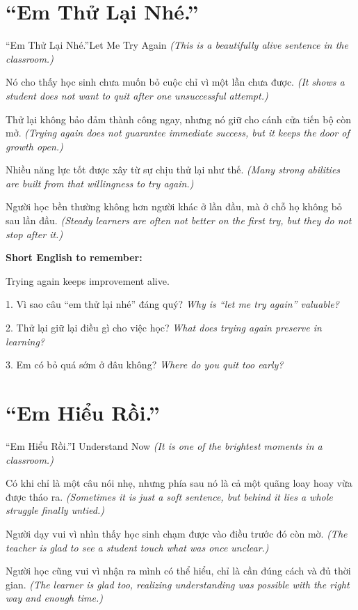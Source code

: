 \section{``Em Thử Lại Nhé.''}
\begin{truyen}{``Em Thử Lại Nhé.''}{Let Me Try Again}
\textit{(This is a beautifully alive sentence in the classroom.)}

Nó cho thấy học sinh chưa muốn bỏ cuộc chỉ vì một lần chưa được.
\textit{(It shows a student does not want to quit after one unsuccessful attempt.)}

Thử lại không bảo đảm thành công ngay, nhưng nó giữ cho cánh cửa tiến bộ còn mở.
\textit{(Trying again does not guarantee immediate success, but it keeps the door of growth open.)}

Nhiều năng lực tốt được xây từ sự chịu thử lại như thế.
\textit{(Many strong abilities are built from that willingness to try again.)}
\end{truyen}

\begin{baihoc}
Người học bền thường không hơn người khác ở lần đầu, mà ở chỗ họ không bỏ sau lần đầu.
\textit{(Steady learners are often not better on the first try, but they do not stop after it.)}
\end{baihoc}

\begin{ghinhoanh}
\textbf{Short English to remember:}

Trying again keeps improvement alive.

\end{ghinhoanh}

\begin{tuhocnhanh}
1. Vì sao câu ``em thử lại nhé'' đáng quý? \textit{Why is ``let me try again'' valuable?}

2. Thử lại giữ lại điều gì cho việc học? \textit{What does trying again preserve in learning?}

3. Em có bỏ quá sớm ở đâu không? \textit{Where do you quit too early?}
\end{tuhocnhanh}
\ngancach

\section{``Em Hiểu Rồi.''}
\begin{truyen}{``Em Hiểu Rồi.''}{I Understand Now}
\textit{(It is one of the brightest moments in a classroom.)}

Có khi chỉ là một câu nói nhẹ, nhưng phía sau nó là cả một quãng loay hoay vừa được tháo ra.
\textit{(Sometimes it is just a soft sentence, but behind it lies a whole struggle finally untied.)}

Người dạy vui vì nhìn thấy học sinh chạm được vào điều trước đó còn mờ.
\textit{(The teacher is glad to see a student touch what was once unclear.)}

Người học cũng vui vì nhận ra mình có thể hiểu, chỉ là cần đúng cách và đủ thời gian.
\textit{(The learner is glad too, realizing understanding was possible with the right way and enough time.)}
\end{truyen}

